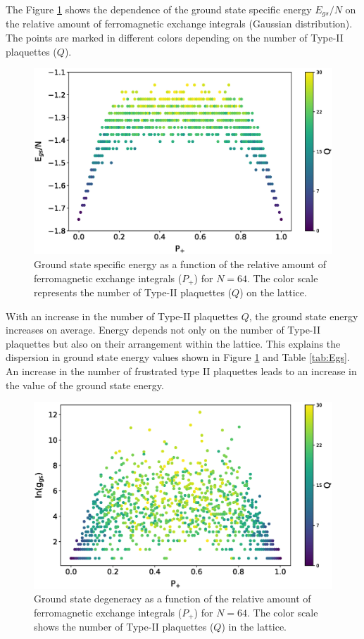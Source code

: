\documentclass[preprint,12pt]{elsarticle}
\begin{document}
	The Figure \ref{fig:E(Q)} shows the dependence of the ground state specific energy $E_{gs}/N$ on the relative amount of ferromagnetic exchange integrals (Gaussian distribution). The points are marked in different colors depending on the number of Type-II plaquettes ($Q$).
	
	\begin{figure}[H]
		\centering
		\includegraphics[width=1.0\linewidth]{pictures/E_P_Q.eps}
		\caption{Ground state specific energy as a function of the relative amount of ferromagnetic exchange integrals ($P_+$) for $N=64$. The color scale represents the number of Type-II plaquettes ($Q$) on the lattice.}
		\label{fig:E(Q)}
	\end{figure}
	
	With an increase in the number of Type-II plaquettes $Q$, the ground state energy increases on average. Energy depends not only on the number of Type-II plaquettes but also on their arrangement within the lattice. This explains the dispersion in ground state energy values shown in Figure \ref{fig:E(Q)} and Table \ref{tab:Egs}. An increase in the number of frustrated type II plaquettes leads to an increase in the value of the ground state energy.
	
	
	\begin{figure}[H]
		\centering
		\includegraphics[width=1.0\linewidth]{pictures/lng_P_Q.eps}
		\caption{Ground state degeneracy as a function of the relative amount of ferromagnetic exchange integrals ($P_+$) for $N=64$. The color scale shows the number of Type-II plaquettes ($Q$) in the lattice.}
		\label{fig:g(Q)}
	\end{figure}
	
\end{document}
